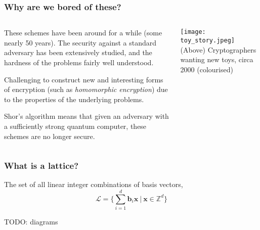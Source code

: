 \documentclass[
aspectratio=169, %
t, %
onlytextwidth, %
10pt, %
]{beamer}
\begin{document}

\begin{frame}
    \frametitle{Why are we bored of these?}
    \begin{columns}[T] %
        \begin{column}{0.48\linewidth} %
            These schemes have been around for a while (some nearly 50 years). The security against a standard adversary has been extensively studied, and the hardness of the problems fairly well understood.

            Challenging to construct new and interesting forms of encryption (such as \textit{homomorphic encryption}) due to the properties of the underlying problems.

            Shor's algorithm means that given an adversary with a sufficiently strong quantum computer, these schemes are no longer secure.
        \end{column}
        \begin{column}{0.48\linewidth} %
            \texttt{[image: toy\_story.jpeg]} %
            {\tiny\textcolor{ICLBlue}{(Above) Cryptographers wanting new toys, circa 2000 (colourised)}}
        \end{column}
    \end{columns}
\end{frame}


\begin{frame}
    \frametitle{What is a lattice?}

    \begin{adjustwidth}{0cm}{0cm} %

        \begin{tcolorbox}[colback=ICLBlue!5!white,colframe=ICLBlue,title=\textbf{Definition:} Lattice]
            The set of all linear integer combinations of basis vectors,
            \[
                \mathcal{L} = \{ \sum_{i = 1}^{d}\mathbf{b}_i\mathbf{x} \ | \ \mathbf{x} \in \mathbb{Z}^d \}
            \]
        \end{tcolorbox}

        \Huge{TODO: diagrams}
    \end{adjustwidth}
\end{frame}
\end{document}
